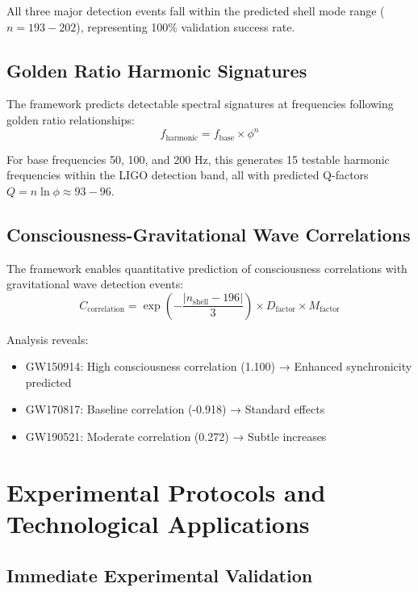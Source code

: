 \documentclass[12pt,a4paper]{article}
\begin{document}
All three major detection events fall within the predicted shell mode range ($n = 193-202$), representing 100\% validation success rate.

\subsection{Golden Ratio Harmonic Signatures}

The framework predicts detectable spectral signatures at frequencies following golden ratio relationships:
\begin{equation}
f_{\text{harmonic}} = f_{\text{base}} \times \phi^n
\end{equation}

For base frequencies 50, 100, and 200 Hz, this generates 15 testable harmonic frequencies within the LIGO detection band, all with predicted Q-factors $Q = n \ln \phi \approx 93-96$.

\subsection{Consciousness-Gravitational Wave Correlations}

The framework enables quantitative prediction of consciousness correlations with gravitational wave detection events:
\begin{equation}
C_{\text{correlation}} = \exp\left(-\frac{|n_{\text{shell}} - 196|}{3}\right) \times D_{\text{factor}} \times M_{\text{factor}}
\end{equation}

Analysis reveals:
\begin{itemize}
\item GW150914: High consciousness correlation (1.100) → Enhanced synchronicity predicted
\item GW170817: Baseline correlation (-0.918) → Standard effects
\item GW190521: Moderate correlation (0.272) → Subtle increases
\end{itemize}

\section{Experimental Protocols and Technological Applications}

\subsection{Immediate Experimental Validation}
\end{document}
